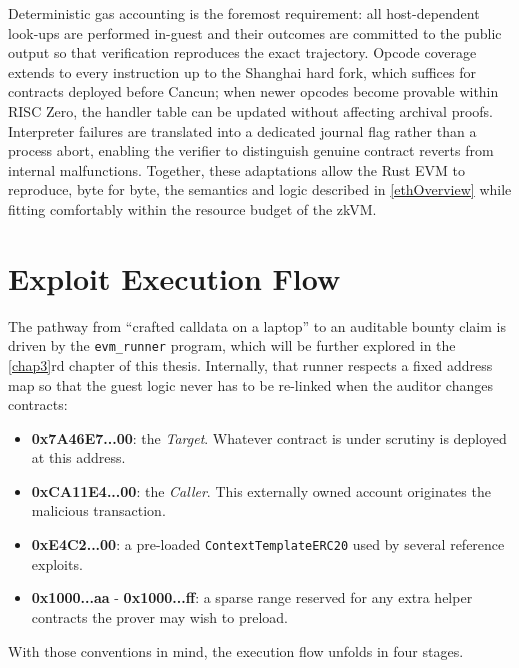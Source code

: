 Deterministic gas accounting is the foremost requirement: all host-dependent look-ups are performed in-guest and their outcomes are committed to the public output so that verification reproduces the exact trajectory. Opcode coverage extends to every instruction up to the Shanghai hard fork, which suffices for contracts deployed before Cancun; when newer opcodes become provable within RISC Zero, the handler table can be updated without affecting archival proofs. Interpreter failures are translated into a dedicated journal flag rather than a process abort, enabling the verifier to distinguish genuine contract reverts from internal malfunctions. Together, these adaptations allow the Rust EVM to reproduce, byte for byte, the semantics and logic described in \ref{ethOverview} while fitting comfortably within the resource budget of the zkVM.

\section{Exploit Execution Flow}\label{sec:exploit_flow}

The pathway from “crafted calldata on a laptop” to an auditable bounty claim is
driven by the \texttt{evm\_runner} program, which will be further explored in the \ref{chap3}rd chapter of this thesis. Internally, that runner respects a fixed  address map so that the guest logic never has to be re-linked when the auditor changes contracts:

\begin{itemize}
  \item \textbf{0x7A46E7...00}: the \emph{Target}. Whatever contract is under scrutiny is deployed at this address.
  \item \textbf{0xCA11E4...00}: the \emph{Caller}. This externally owned account originates the malicious transaction.
  \item \textbf{0xE4C2...00}: a pre-loaded \texttt{ContextTemplateERC20} used by several reference exploits.
  \item \textbf{0x1000...aa} - \textbf{0x1000...ff}: a sparse range reserved for any extra helper contracts the prover may wish to preload.
\end{itemize}

With those conventions in mind, the execution flow unfolds in four stages.


